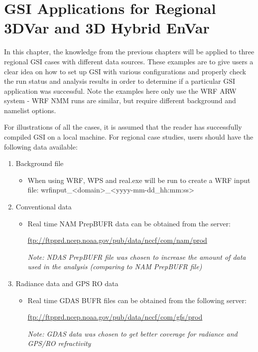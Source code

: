 \chapter{GSI Applications for Regional 3DVar and 3D Hybrid EnVar}
\setlength{\parskip}{12pt}

In this chapter, the knowledge from the previous chapters will be applied to three regional GSI cases with different data sources. These examples are to give users a clear idea on how to set up GSI with various configurations and properly check the run status and analysis results in order to determine if a particular GSI application was successful. Note the examples here only use the WRF ARW system - WRF NMM runs are similar, but require different background and namelist options. 

For illustrations of all the cases, it is assumed that the reader has successfully compiled GSI on a local machine. For regional case studies, users should have the following data available:

\begin{enumerate}
\item Background file
\begin{itemize}
\item When using WRF, WPS and real.exe will be run to create a WRF input file: wrfinput\_<domain>\_<yyyy-mm-dd\_hh:mm:ss>
\end{itemize}
\item Conventional data

\begin{itemize}
\item Real time NAM PrepBUFR data can be obtained from the server:

\url{ftp://ftpprd.ncep.noaa.gov/pub/data/nccf/com/nam/prod}

\textit{Note: NDAS PrepBUFR file was chosen to increase the amount of data used in the analysis (comparing to NAM PrepBUFR file) }
\end{itemize}

\item Radiance data and GPS RO data

\begin{itemize}
\item Real time GDAS BUFR files can be obtained from the following server:

\url{ftp://ftpprd.ncep.noaa.gov/pub/data/nccf/com/gfs/prod}

\textit{Note: GDAS data was chosen to get better coverage for radiance and GPS/RO refractivity}
\end{itemize}

\end{enumerate}

